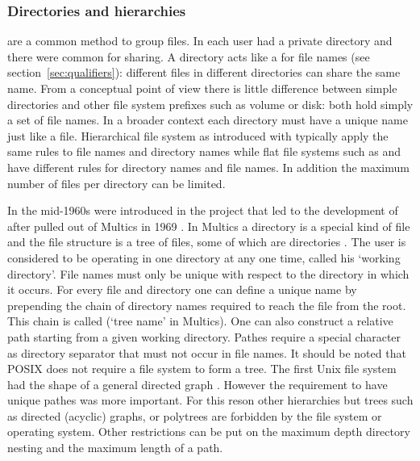 \subsubsection{Directories and hierarchies}

 are a common method to group files. In
 each user had a private directory and there were common
 for sharing. A directory acts like a  for
file names (see section~\ref{sec:qualifiers}): different files in different
directories can share the same name. From a conceptual point of view there is
little difference between simple directories and other file system prefixes
such as volume or disk: both hold simply a set of file names.  In a broader
context each directory must have a unique name just like a file.  Hierarchical
file system as introduced with  typically apply the same rules to
file names and directory names while flat file systems such as 
and  have different rules for directory names and file names.
In addition the maximum number of files per directory can be limited.

In the mid-1960s  were introduced
in the  project that led to the development of  after
 pulled out of Multics in 1969 \cite{Ritchie1979}. In Multics a
directory is a special kind of file and the file structure is a tree of files,
some of which are directories \cite{Daley1965}. The user is considered to be
operating in one directory at any one time, called his `working directory'.
File names must only be unique with respect to the directory in which it
occurs. For every file and directory one can define a unique name by prepending
the chain of directory names required to reach the file from the root. This
chain is called  (`tree name' in Multics). One can also
construct a relative path starting from a given working directory.  Pathes
require a special character as directory separator that must not occur in file
names. It should be noted that POSIX does not require a file system to form a
tree. The first Unix file system had the shape of a general directed graph
\cite{Ritchie1979}.  However the requirement to have unique pathes was more
important. For this reson other hierarchies but trees such as directed
(acyclic) graphs, or polytrees are forbidden by the file system or operating
system. Other restrictions can be put on the maximum depth directory nesting
and the maximum length of a path.

